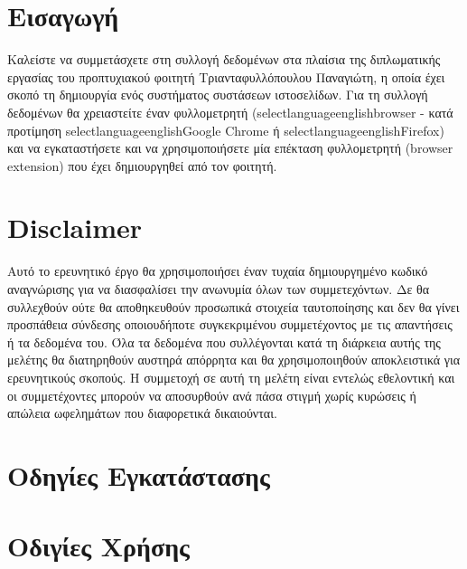 \documentclass{article}
\begin{document}
\section{Εισαγωγή}

Καλείστε να συμμετάσχετε στη συλλογή δεδομένων στα πλαίσια της διπλωματικής εργασίας του προπτυχιακού φοιτητή Τριανταφυλλόπουλου Παναγιώτη, η οποία έχει σκοπό τη δημιουργία ενός συστήματος συστάσεων ιστοσελίδων. Για τη συλλογή δεδομένων θα χρειαστείτε έναν φυλλομετρητή (selectlanguage{english}browser - κατά προτίμηση selectlanguage{english}Google Chrome ή selectlanguage{english}Firefox) και να εγκαταστήσετε και να χρησιμοποιήσετε μία επέκταση φυλλομετρητή (browser extension) που έχει δημιουργηθεί από τον φοιτητή. 


\section{Disclaimer}
 Αυτό το ερευνητικό έργο θα χρησιμοποιήσει έναν τυχαία δημιουργημένο κωδικό αναγνώρισης για να διασφαλίσει την ανωνυμία όλων των συμμετεχόντων. Δε θα συλλεχθούν ούτε θα αποθηκευθούν προσωπικά στοιχεία ταυτοποίησης και δεν θα γίνει προσπάθεια σύνδεσης οποιουδήποτε συγκεκριμένου συμμετέχοντος με τις απαντήσεις ή τα δεδομένα του. Όλα τα δεδομένα που συλλέγονται κατά τη διάρκεια αυτής της μελέτης θα διατηρηθούν αυστηρά απόρρητα και θα χρησιμοποιηθούν αποκλειστικά για ερευνητικούς σκοπούς. Η συμμετοχή σε αυτή τη μελέτη είναι εντελώς εθελοντική και οι συμμετέχοντες μπορούν να αποσυρθούν ανά πάσα στιγμή χωρίς κυρώσεις ή απώλεια ωφελημάτων που διαφορετικά δικαιούνται.

\section{Οδηγίες Εγκατάστασης}

\section{Οδιγίες Χρήσης}
\end{document}
